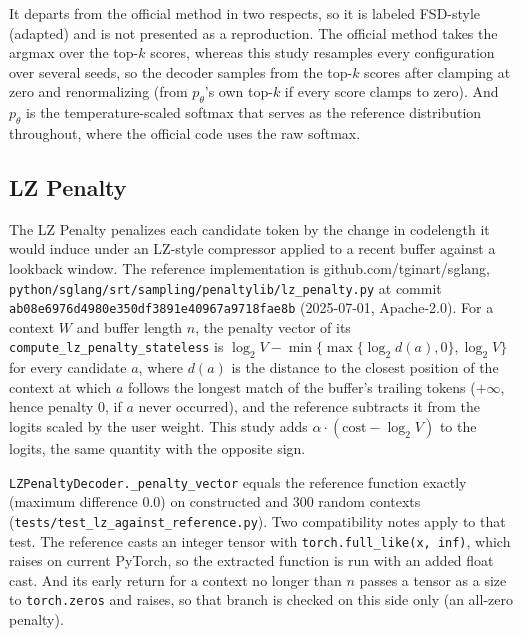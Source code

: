 It departs from the official method in two respects, so it is labeled FSD-style (adapted) and is not presented as a reproduction. The official method takes the argmax over the top-$k$ scores, whereas this study resamples every configuration over several seeds, so the decoder samples from the top-$k$ scores after clamping at zero and renormalizing (from $p_\theta$'s own top-$k$ if every score clamps to zero). And $p_\theta$ is the temperature-scaled softmax that serves as the reference distribution throughout, where the official code uses the raw softmax.

\subsection{LZ Penalty}
\label{app:lz}
The LZ Penalty \citep{ginart2025lzpenalty} penalizes each candidate token by the change in codelength it would induce under an LZ-style compressor applied to a recent buffer against a lookback window. The reference implementation is github.com/tginart/sglang, \texttt{python/\allowbreak{}sglang/\allowbreak{}srt/\allowbreak{}sampling/\allowbreak{}penaltylib/\allowbreak{}lz\_\allowbreak{}penalty.py} at commit \texttt{ab08e6976d49\allowbreak{}80e350df3891\allowbreak{}e40967a9718f\allowbreak{}ae8b} (2025-07-01, Apache-2.0). For a context $W$ and buffer length $n$, the penalty vector of its \texttt{compute\_lz\_penalty\_stateless} is $\log_2V-\min\{\max\{\log_2 d(a),0\},\log_2V\}$ for every candidate $a$, where $d(a)$ is the distance to the closest position of the context at which $a$ follows the longest match of the buffer's trailing tokens ($+\infty$, hence penalty $0$, if $a$ never occurred), and the reference subtracts it from the logits scaled by the user weight. This study adds $\alpha\cdot(\text{cost}-\log_2V)$ to the logits, the same quantity with the opposite sign.

\texttt{LZPenaltyDecoder.\_penalty\_vector} equals the reference function exactly (maximum difference $0.0$) on constructed and 300 random contexts (\texttt{tests/test\_\allowbreak{}lz\_\allowbreak{}against\_\allowbreak{}reference.py}). Two compatibility notes apply to that test. The reference casts an integer tensor with \texttt{torch.full\_like(x, inf)}, which raises on current PyTorch, so the extracted function is run with an added float cast. And its early return for a context no longer than $n$ passes a tensor as a size to \texttt{torch.zeros} and raises, so that branch is checked on this side only (an all-zero penalty).

